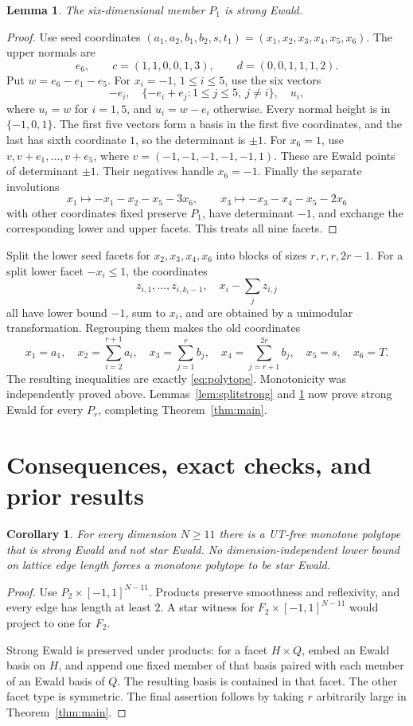 \documentclass[11pt]{article}
\newtheorem{lemma}[theorem]{Lemma}
\newtheorem{corollary}[theorem]{Corollary}
\theoremstyle{remark}\newtheorem{remark}[theorem]{Remark}
\begin{document}
\begin{lemma}\label{lem:seedstrong}
The six-dimensional member \(P_1\) is strong Ewald.
\end{lemma}
\begin{proof}
Use seed coordinates
\((a_1,a_2,b_1,b_2,s,t_1)=(x_1,x_2,x_3,x_4,x_5,x_6)\).
The upper normals are
\[
 e_6,\qquad c=(1,1,0,0,1,3),\qquad d=(0,0,1,1,1,2).
\]
Put \(w=e_6-e_1-e_5\).
For \(x_i=-1\), \(1\le i\le5\), use the six vectors
\[
 -e_i,\quad\{-e_i+e_j:1\le j\le5,\ j\ne i\},\quad u_i,
\]
where \(u_i=w\) for \(i=1,5\), and \(u_i=w-e_i\) otherwise.
Every normal height is in \(\{-1,0,1\}\).
The first five vectors form a basis in the first five coordinates,
and the last has sixth coordinate \(1\), so the determinant is \(\pm1\).
For \(x_6=1\), use \(v,v+e_1,\ldots,v+e_5\), where
\(v=(-1,-1,-1,-1,-1,1)\).
These are Ewald points of determinant \(\pm1\).
Their negatives handle \(x_6=-1\).
Finally the separate involutions
\[
 x_1\mapsto-x_1-x_2-x_5-3x_6,\qquad
 x_3\mapsto-x_3-x_4-x_5-2x_6
\]
with other coordinates fixed preserve \(P_1\), have determinant \(-1\),
and exchange the corresponding lower and upper facets.
This treats all nine facets.
\end{proof}

Split the lower seed facets for \(x_2,x_3,x_4,x_6\) into blocks of
sizes \(r,r,r,2r-1\).
For a split lower facet \(-x_i\le1\), the coordinates
\[
 z_{i,1},\ldots,z_{i,k_i-1},\quad x_i-\sum_jz_{i,j}
\]
all have lower bound \(-1\), sum to \(x_i\), and are obtained by a
unimodular transformation.
Regrouping them makes the old coordinates
\[
 x_1=a_1,\quad x_2=\sum_{i=2}^{r+1}a_i,\quad
 x_3=\sum_{j=1}^r b_j,\quad x_4=\sum_{j=r+1}^{2r}b_j,\quad
 x_5=s,\quad x_6=T.
\]
The resulting inequalities are exactly \eqref{eq:polytope}.
Monotonicity was independently proved above.
Lemmas~\ref{lem:splitstrong} and \ref{lem:seedstrong} now prove strong
Ewald for every \(P_r\), completing Theorem~\ref{thm:main}.

\section{Consequences, exact checks, and prior results}

\begin{corollary}
For every dimension \(N\ge11\) there is a UT-free monotone polytope
that is strong Ewald and not star Ewald.
No dimension-independent lower bound on lattice edge length forces a
monotone polytope to be star Ewald.
\end{corollary}
\begin{proof}
Use \(P_2\times[-1,1]^{N-11}\).
Products preserve smoothness and reflexivity, and every edge has
length at least \(2\). A star witness for
\(F_2\times[-1,1]^{N-11}\) would project to one for \(F_2\).

Strong Ewald is preserved under products: for a facet \(H\times Q\),
embed an Ewald basis on \(H\), and append one fixed member of that
basis paired with each member of an Ewald basis of \(Q\).
The resulting basis is contained in that facet. The other facet type
is symmetric. The final assertion follows by taking \(r\) arbitrarily
large in Theorem~\ref{thm:main}.
\end{proof}
\end{document}
